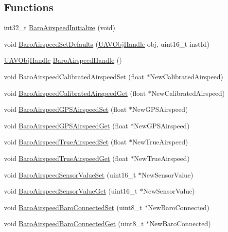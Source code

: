\subsection*{\-Functions}
\begin{DoxyCompactItemize}
\item 
int32\-\_\-t \hyperlink{group___baro_airspeed_ga236f2c6ead3f630769145beccbeb7461}{\-Baro\-Airspeed\-Initialize} (void)
\item 
void \hyperlink{group___baro_airspeed_gab7da9f43ae656c0580944b025b7cdf22}{\-Baro\-Airspeed\-Set\-Defaults} (\hyperlink{targets_2_u_a_v_objects_2inc_2uavobjectmanager_8h_a279053e22be53ce9f895043aaeb91e3b}{\-U\-A\-V\-Obj\-Handle} obj, uint16\-\_\-t inst\-Id)
\item 
\hyperlink{targets_2_u_a_v_objects_2inc_2uavobjectmanager_8h_a279053e22be53ce9f895043aaeb91e3b}{\-U\-A\-V\-Obj\-Handle} \hyperlink{group___baro_airspeed_ga18e242e1065662964564716e9e3bb1d1}{\-Baro\-Airspeed\-Handle} ()
\item 
void \hyperlink{group___baro_airspeed_ga89a4a69b25bc88cc0119bcda8d20a100}{\-Baro\-Airspeed\-Calibrated\-Airspeed\-Set} (float $\ast$\-New\-Calibrated\-Airspeed)
\item 
void \hyperlink{group___baro_airspeed_gae5caf42f5ec7960bf9c20f80fe33bd03}{\-Baro\-Airspeed\-Calibrated\-Airspeed\-Get} (float $\ast$\-New\-Calibrated\-Airspeed)
\item 
void \hyperlink{group___baro_airspeed_gab8877d74fc7675d45b44a085300188f4}{\-Baro\-Airspeed\-G\-P\-S\-Airspeed\-Set} (float $\ast$\-New\-G\-P\-S\-Airspeed)
\item 
void \hyperlink{group___baro_airspeed_ga9eb8900b51943bf6c22a2d7da057e39d}{\-Baro\-Airspeed\-G\-P\-S\-Airspeed\-Get} (float $\ast$\-New\-G\-P\-S\-Airspeed)
\item 
void \hyperlink{group___baro_airspeed_gaf9cacdac6f9b4a96f37395017561089c}{\-Baro\-Airspeed\-True\-Airspeed\-Set} (float $\ast$\-New\-True\-Airspeed)
\item 
void \hyperlink{group___baro_airspeed_gae78404444852278b3ea8d2e32638c7a6}{\-Baro\-Airspeed\-True\-Airspeed\-Get} (float $\ast$\-New\-True\-Airspeed)
\item 
void \hyperlink{group___baro_airspeed_ga258744a53cc7d1cf2efab73909d31cc6}{\-Baro\-Airspeed\-Sensor\-Value\-Set} (uint16\-\_\-t $\ast$\-New\-Sensor\-Value)
\item 
void \hyperlink{group___baro_airspeed_ga101efc4f3ad830937b98abf774b11260}{\-Baro\-Airspeed\-Sensor\-Value\-Get} (uint16\-\_\-t $\ast$\-New\-Sensor\-Value)
\item 
void \hyperlink{group___baro_airspeed_ga73fc6fe5136541ca23ace39f02cd9e76}{\-Baro\-Airspeed\-Baro\-Connected\-Set} (uint8\-\_\-t $\ast$\-New\-Baro\-Connected)
\item 
void \hyperlink{group___baro_airspeed_ga09ec042e8c08f04a41f95dc95d7e5d54}{\-Baro\-Airspeed\-Baro\-Connected\-Get} (uint8\-\_\-t $\ast$\-New\-Baro\-Connected)
\end{DoxyCompactItemize}


